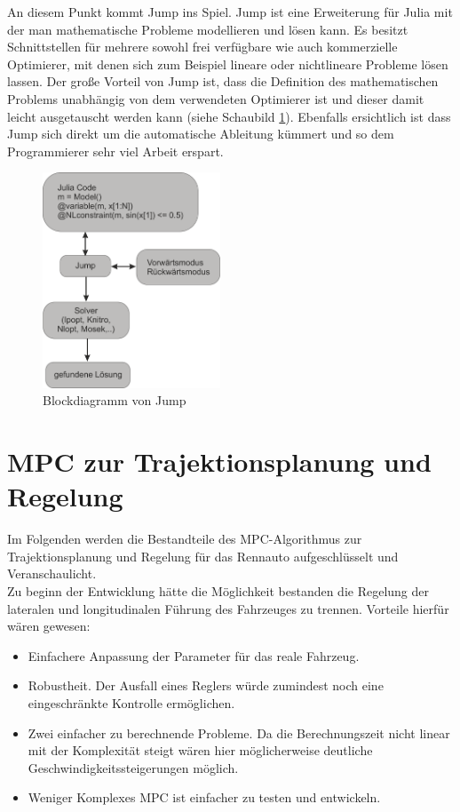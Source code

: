 \documentclass{like}
\begin{document}
An diesem Punkt kommt Jump ins Spiel. Jump ist eine Erweiterung für Julia mit der man mathematische Probleme modellieren und lösen kann. Es besitzt Schnittstellen für mehrere sowohl frei verfügbare wie auch kommerzielle Optimierer, mit denen sich zum Beispiel lineare oder nichtlineare Probleme lösen lassen. Der große Vorteil von Jump ist, dass die Definition des mathematischen Problems unabhängig von dem verwendeten Optimierer ist und dieser damit leicht ausgetauscht werden kann (siehe Schaubild \ref{fig:jumpDiagram}). Ebenfalls ersichtlich ist dass Jump sich direkt um die automatische Ableitung kümmert und so dem Programmierer sehr viel Arbeit erspart. 

\begin{figure}[ht!]
	\centering
	\includegraphics[width=150pt]{Abbildungen/jumpDiagram.png}
	\caption{Blockdiagramm von Jump}
	\label{fig:jumpDiagram}
\end{figure}

\chapter{MPC zur Trajektionsplanung und Regelung}
Im Folgenden werden die Bestandteile des \acl{MPC}-Algorithmus zur Trajektionsplanung und Regelung für das Rennauto aufgeschlüsselt und Veranschaulicht.\\

Zu beginn der Entwicklung hätte die Möglichkeit bestanden die Regelung der lateralen und longitudinalen Führung des Fahrzeuges zu trennen. 
Vorteile hierfür wären gewesen:
\begin{itemize}
	\item Einfachere Anpassung der Parameter für das reale Fahrzeug.
	\item Robustheit. Der Ausfall eines Reglers würde zumindest noch eine eingeschränkte Kontrolle ermöglichen.
	\item Zwei einfacher zu berechnende Probleme. Da die Berechnungszeit nicht linear mit der Komplexität steigt wären hier möglicherweise deutliche Geschwindigkeitssteigerungen möglich.
	\item Weniger Komplexes \ac{MPC} ist einfacher zu testen und entwickeln.
\end{itemize}
\end{document}
